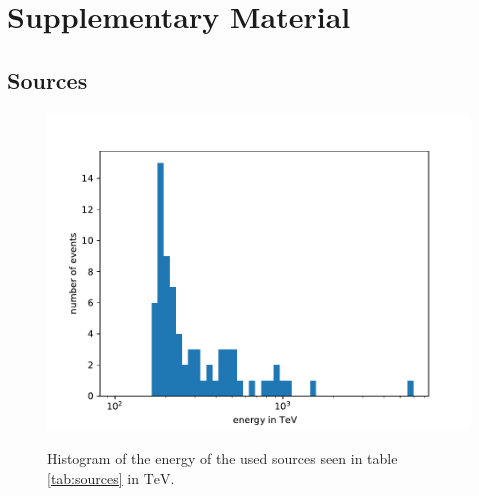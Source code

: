 \chapter{Supplementary Material}

\section{Sources}

\begin{figure}
    \centering
    \includegraphics[width=\linewidth]{Plots/appendix/sources_energy.pdf}
    \label{fig:sources_energy}
    \caption{Histogram of the energy of the used sources seen in table \ref{tab:sources} in $\si{\tera\electronvolt}$.}
\end{figure}
